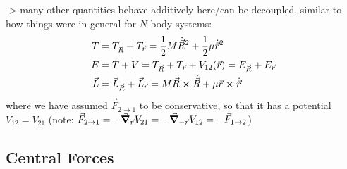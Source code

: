 \documentclass[../class_mech_main.tex]{subfiles}
\begin{document}
-> many other quantities behave additively here/can be decoupled, similar to how things were in general for $N$-body systems:
\begin{subequations}
	\begin{align}
		T &= T_{\vec{R}} + T_{\vec{r}} = \frac{1}{2} M \dot{\vec{R}}^2 + \frac{1}{2} \mu \dot{\vec{r}}^2
		\\
		E &= T + V = T_{\vec{R}} + T_{\vec{r}} + V_{12}(\vec{r}) = E_{\vec{R}} + E_{\vec{r}}
		\\
		\vec{L} &= \vec{L}_{\vec{R}} + \vec{L}_{\vec{r}} = M \vec{R} \cross \dot{\vec{R}} + \mu \vec{r} \cross \dot{\vec{r}}
	\end{align}
\end{subequations}
where we have assumed $\vec{F}_{2 \rightarrow 1}$ to be conservative, so that it has a potential $V_{12} = V_{21}$ (note: $\vec{F}_{2 \rightarrow 1} = - \grad_{\vec{r}} V_{21} = - \grad_{-\vec{r}} V_{12} = - \vec{F}_{1 \rightarrow 2}$)











	    \subsection{Central Forces}
\end{document}
